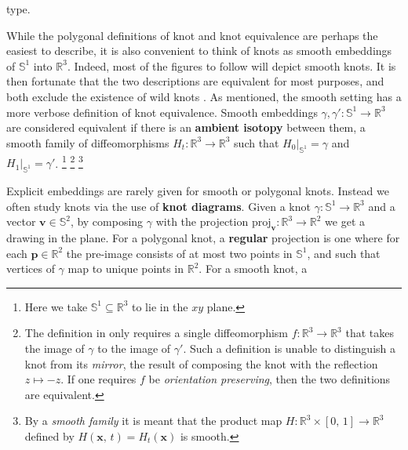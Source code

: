     type.
    \par\hfill\par
    While the polygonal definitions of knot and knot equivalence are perhaps
    the easiest to describe, it is also convenient to think of knots as smooth
    embeddings of $\mathbb{S}^{1}$ into $\mathbb{R}^{3}$. Indeed, most of the
    figures to follow will depict smooth knots. It is then fortunate that the
    two descriptions are equivalent for most purposes, and both exclude the
    existence of wild knots \cite[p.~147]{CrowellFoxKnotTheory}. As mentioned,
    the smooth setting has a more verbose definition of knot equivalence.
    Smooth embeddings $\gamma,\gamma':\mathbb{S}^{1}\rightarrow\mathbb{R}^{3}$
    are considered equivalent if there is an \textbf{ambient isotopy}
    between them, a smooth family of diffeomorphisms
    $H_{t}:\mathbb{R}^{3}\rightarrow\mathbb{R}^{3}$ such that
    $H_{0}|_{\mathbb{S}^{1}}=\gamma$ and $H_{1}|_{\mathbb{S}^{1}}=\gamma'$.%
    \footnote{%
        Here we take $\mathbb{S}^{1}\subseteq\mathbb{R}^{3}$
        to lie in the $xy$ plane.
    }
    \footnote{%
        The definition in \cite[p.~4]{CrowellFoxKnotTheory} only requires a
        single diffeomorphism $f:\mathbb{R}^{3}\rightarrow\mathbb{R}^{3}$ that
        takes the image of $\gamma$ to the image of $\gamma'$. Such a
        definition is unable to distinguish a knot from its \textit{mirror},
        the result of composing the knot with the reflection $z\mapsto{-z}$.
        If one requires $f$ be \textit{orientation preserving}, then the
        two definitions are equivalent.
    }
    \footnote{%
        By a \textit{smooth family} it is meant that the product map
        $H:\mathbb{R}^{3}\times[0,\,1]\rightarrow\mathbb{R}^{3}$ defined by
        $H(\mathbf{x},\,t)=H_{t}(\mathbf{x})$ is smooth.
    }
    \par\hfill\par
    Explicit embeddings are rarely given for smooth or polygonal knots. Instead
    we often study knots via the use of \textbf{knot diagrams}. Given a knot
    $\gamma:\mathbb{S}^{1}\rightarrow\mathbb{R}^{3}$ and a vector
    $\mathbf{v}\in\mathbb{S}^{2}$, by composing $\gamma$ with the projection
    $\textrm{proj}_{\mathbf{v}}:\mathbb{R}^{3}\rightarrow\mathbb{R}^{2}$ we get
    a drawing in the plane. For a polygonal knot, a \textbf{regular} projection
    is one where for each $\mathbf{p}\in\mathbb{R}^{2}$ the pre-image consists
    of at most two points in $\mathbb{S}^{1}$, and such that vertices of
    $\gamma$ map to unique points in $\mathbb{R}^{2}$. For a smooth knot, a
